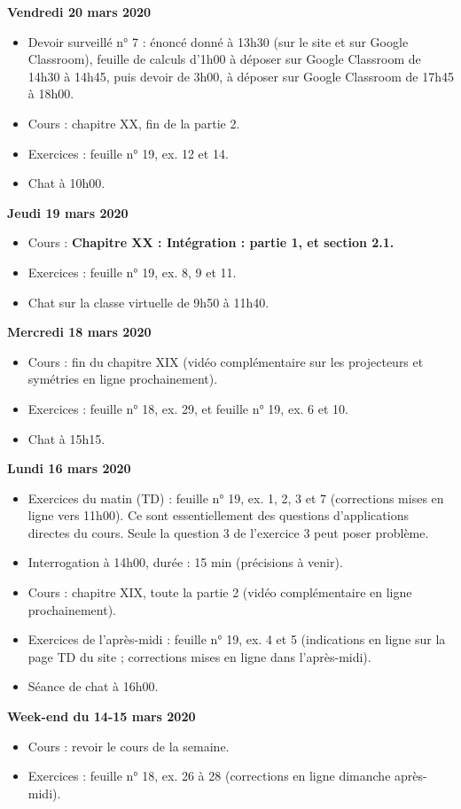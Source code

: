 \documentclass[12pt,a4paper]{article}
\begin{document}
\noindent\textbf{\bf Vendredi 20 mars 2020}
\begin{itemize}
\item Devoir surveillé n° 7 : énoncé donné à 13h30 (sur le site et sur Google Classroom), feuille de calculs d'1h00 à déposer sur Google Classroom de 14h30 à 14h45, puis devoir de 3h00, à déposer sur Google Classroom de 17h45 à 18h00.
\item Cours : chapitre XX, fin de la partie 2.
\item Exercices : feuille n° 19, ex. 12 et 14.
\item Chat à 10h00.\vspace{.4cm}
\end{itemize}
 
\noindent\textbf{Jeudi 19 mars 2020}
\begin{itemize}
\item Cours : \bf Chapitre XX \rm : Intégration : partie 1, et section 2.1.
\item Exercices : feuille n° 19, ex. 8, 9 et 11.
\item Chat sur la classe virtuelle de 9h50 à 11h40.\vspace{.4cm}
\end{itemize}

\noindent\textbf{Mercredi 18 mars 2020}
\begin{itemize}
\item Cours : fin du chapitre XIX (vidéo complémentaire sur les projecteurs et symétries en ligne prochainement).
\item Exercices : feuille n° 18, ex. 29, et feuille n° 19, ex. 6 et 10.
\item Chat à 15h15.\vspace{.4cm}
\end{itemize}

\noindent\textbf{\bf Lundi 16 mars 2020}
\begin{itemize}
\item Exercices du matin (TD) : feuille n° 19, ex. 1, 2, 3 et 7 (corrections mises en ligne vers 11h00). Ce sont essentiellement des questions d'applications directes du cours. Seule la question 3 de l'exercice 3 peut poser problème.
\item Interrogation à 14h00, durée : 15 min (précisions à venir).
\item Cours : chapitre XIX, toute la partie 2 (vidéo complémentaire en ligne prochainement).
\item Exercices de l'après-midi : feuille n° 19, ex. 4 et 5 (indications en ligne sur la page TD du site ; corrections mises en ligne dans l'après-midi).
\item Séance de chat à 16h00.
\vspace{.4cm}
\end{itemize}

\noindent\textbf{Week-end du 14-15 mars 2020}
\begin{itemize}
\item Cours : revoir le cours de la semaine.
\item Exercices : feuille n° 18, ex. 26 à 28 (corrections en ligne dimanche après-midi).\vspace{.4cm}
\end{itemize}


\label{end}
\end{document}

